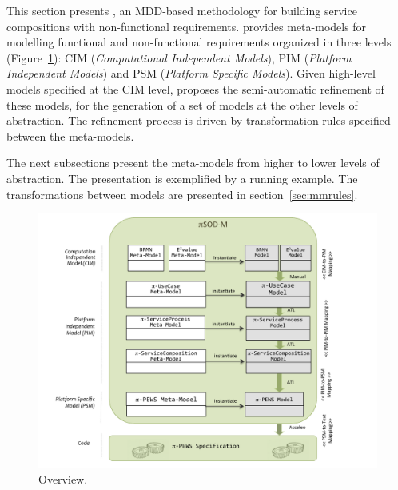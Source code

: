 
This section presents \pisodm, an MDD-based methodology for building service compositions with non-functional requirements. 
\pisodm provides meta-models for modelling functional and non-functional requirements organized in three levels (Figure~\ref{fig:piSOD-M}): CIM (\textit{Computational Independent Models}), PIM (\textit{Platform Independent Models}) and PSM (\textit{Platform Specific Models}). 
Given  high-level models specified at the CIM level, \pisodm proposes the semi-automatic refinement of these models, for the generation of a set of models at the other levels of abstraction.
The refinement process is driven by transformation rules specified between the meta-models.

The next subsections present the meta-models from higher to lower levels of abstraction.
The presentation is exemplified by a running example.
The transformations between models are presented in section~\ref{sec:mmrules}.

\begin{figure}[h]
\centering
\includegraphics[width=1.0\textwidth]{figs/piSOD-M_process.pdf}
\caption{\pisodm Overview.}
\label{fig:piSOD-M}
\end{figure}



